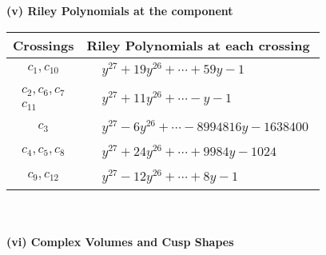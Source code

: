 \documentclass[1p]{elsarticle_modified}
\theoremstyle{definition}
\begin{document}
\flushleft \textbf{(v) Riley Polynomials at the component}\newline \\
\begin{tabular}{m{50pt}|m{274pt}}
Crossings & \hspace{64pt}Riley Polynomials at each crossing \\
\hline $$\begin{aligned}c_{1},c_{10}\end{aligned}$$&$\begin{aligned}
&y^{27}+19 y^{26}+\cdots+59 y-1
\end{aligned}$\\
\hline $$\begin{aligned}c_{2},c_{6},c_{7}\\c_{11}\end{aligned}$$&$\begin{aligned}
&y^{27}+11 y^{26}+\cdots- y-1
\end{aligned}$\\
\hline $$\begin{aligned}c_{3}\end{aligned}$$&$\begin{aligned}
&y^{27}-6 y^{26}+\cdots-8994816 y-1638400
\end{aligned}$\\
\hline $$\begin{aligned}c_{4},c_{5},c_{8}\end{aligned}$$&$\begin{aligned}
&y^{27}+24 y^{26}+\cdots+9984 y-1024
\end{aligned}$\\
\hline $$\begin{aligned}c_{9},c_{12}\end{aligned}$$&$\begin{aligned}
&y^{27}-12 y^{26}+\cdots+8 y-1
\end{aligned}$\\
\hline
\end{tabular}\\~\\
\newpage\flushleft \textbf{(vi) Complex Volumes and Cusp Shapes}
\end{document}
